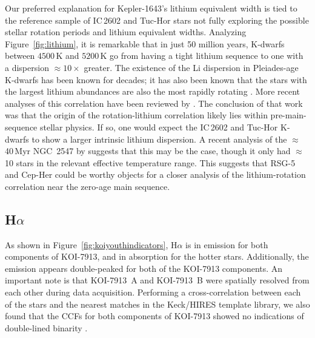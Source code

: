 \documentclass[12pt,twocolumn]{aastex63}
\begin{document}
Our preferred explanation for Kepler-1643's lithium equivalent
width is tied to the reference sample of IC\,2602 and Tuc-Hor
stars not fully exploring the possible stellar rotation
periods and lithium equivalent widths. 
Analyzing Figure~\ref{fig:lithium}, it is remarkable that in
just 50 million years, K-dwarfs between $4500$\,K and $5200$\,K go from
having a tight lithium sequence to one with a dispersion
$\approx10\times$ greater.  The existence of the Li dispersion in
Pleiades-age K-dwarfs has been known for decades; it has also been
known that the stars with the largest lithium abundances are also the
most rapidly rotating
\citep{butler_pleiades_1987,soderblom_evolution_1993}.  More recent
analyses of this correlation have been reviewed by
\citet{bouvier_lithium-rotation_2020}.  The conclusion of that work
was that the origin of the rotation-lithium correlation likely lies
within pre-main-sequence stellar physics.  If so, one would expect the
IC\,2602 and Tuc-Hor K-dwarfs to show a larger intrinsic lithium
dispersion.  A recent analysis of the $\approx$40\,Myr
NGC~2547 by \citet{binks_2022} suggests that this may
be the case, though it only had $\approx$10 stars in the relevant
effective temperature range.
This suggests that
RSG-5 and Cep-Her could be
worthy objects for a closer analysis of the lithium-rotation correlation
near the zero-age main sequence.

\subsection{H$\alpha$}

As shown in Figure~\ref{fig:koiyouthindicators}, H$\alpha$ is in
emission for both components of KOI-7913, and in absorption for the
hotter stars.  Additionally, the emission appears double-peaked for
both of the KOI-7913 components.  An important note is that KOI-7913~A and
KOI-7913~B were spatially resolved from each other during data
acquisition.  Performing a cross-correlation between each of the stars
and the nearest matches in the Keck/HIRES template library, we also
found that the CCFs for both components of KOI-7913 showed no
indications of double-lined binarity \citep{kolbl_detection_2015}.
\end{document}
